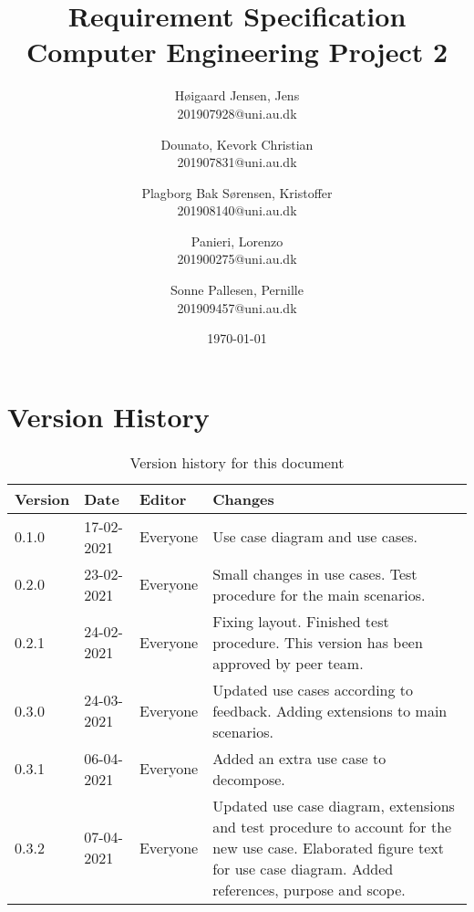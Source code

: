 

\title{\textbf{Requirement Specification} \\
       \large Computer Engineering Project 2}
\author{
  Høigaard Jensen, Jens\\
  201907928@uni.au.dk
  \and
  Dounato, Kevork Christian\\
  201907831@uni.au.dk
  \and
  Plagborg Bak Sørensen, Kristoffer\\
  201908140@uni.au.dk
  \and
  Panieri, Lorenzo\\
  201900275@uni.au.dk
  \and
  Sonne Pallesen, Pernille\\
  201909457@uni.au.dk}
\date{\today}



\maketitle

\section*{Version History}
    \begin{table}[H]
        \centering
        \begin{tabular}{|p{}|p{}|p{}|p{}|}
            \hline
            \textbf{Version} & \textbf{Date} & \textbf{Editor} & \textbf{Changes}\\
            \hline
            \hline
            0.1.0 & 17-02-2021 & Everyone & Use case diagram and use cases.\\
            \hline
            0.2.0 & 23-02-2021 & Everyone & Small changes in use cases. Test procedure for the main scenarios.\\
            \hline
            0.2.1 & 24-02-2021 & Everyone & Fixing layout. Finished test procedure. This version has been approved by peer team.\\
            \hline
            0.3.0 & 24-03-2021 & Everyone & Updated use cases according to feedback. Adding extensions to main scenarios.\\
            \hline
            0.3.1 & 06-04-2021 & Everyone & Added an extra use case to decompose.\\
            \hline
            0.3.2 & 07-04-2021 & Everyone & Updated use case diagram, extensions and test procedure to account for the new use case. Elaborated figure text for use case diagram. Added references, purpose and scope.\\
            \hline
        \end{tabular}
        \caption{Version history for this document}
        \label{tab:my_label}
    \end{table}

